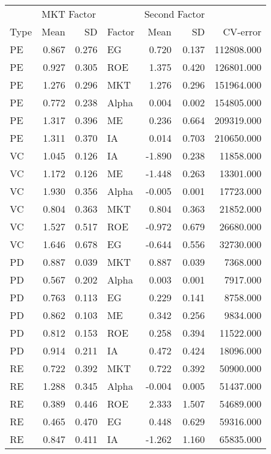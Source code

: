 \documentclass[12pt]{article}
\begin{document}
\begin{table}[ht]
	\centering
	\begin{tabular}{lrrlrrr}
		 & \multicolumn{2}{l}{MKT Factor} & & \multicolumn{2}{l}{Second Factor} & \\ 
		Type & Mean & SD & Factor & Mean & SD & CV-error \\ 
		\hline
		\hline
PE & 0.867 & 0.276 & EG & 0.720 & 0.137 & 112808.000 \\ 
PE & 0.927 & 0.305 & ROE & 1.375 & 0.420 & 126801.000 \\ 
PE & 1.276 & 0.296 & MKT & 1.276 & 0.296 & 151964.000 \\ 
PE & 0.772 & 0.238 & Alpha & 0.004 & 0.002 & 154805.000 \\ 
PE & 1.317 & 0.396 & ME & 0.236 & 0.664 & 209319.000 \\ 
PE & 1.311 & 0.370 & IA & 0.014 & 0.703 & 210650.000 \\ 
\hline
VC & 1.045 & 0.126 & IA & -1.890 & 0.238 & 11858.000 \\ 
VC & 1.172 & 0.126 & ME & -1.448 & 0.263 & 13301.000 \\ 
VC & 1.930 & 0.356 & Alpha & -0.005 & 0.001 & 17723.000 \\ 
VC & 0.804 & 0.363 & MKT & 0.804 & 0.363 & 21852.000 \\ 
VC & 1.527 & 0.517 & ROE & -0.972 & 0.679 & 26680.000 \\ 
VC & 1.646 & 0.678 & EG & -0.644 & 0.556 & 32730.000 \\ 
\hline
PD & 0.887 & 0.039 & MKT & 0.887 & 0.039 & 7368.000 \\ 
PD & 0.567 & 0.202 & Alpha & 0.003 & 0.001 & 7917.000 \\ 
PD & 0.763 & 0.113 & EG & 0.229 & 0.141 & 8758.000 \\ 
PD & 0.862 & 0.103 & ME & 0.342 & 0.256 & 9834.000 \\ 
PD & 0.812 & 0.153 & ROE & 0.258 & 0.394 & 11522.000 \\ 
PD & 0.914 & 0.211 & IA & 0.472 & 0.424 & 18096.000 \\
\hline 
RE & 0.722 & 0.392 & MKT & 0.722 & 0.392 & 50900.000 \\ 
RE & 1.288 & 0.345 & Alpha & -0.004 & 0.005 & 51437.000 \\ 
RE & 0.389 & 0.446 & ROE & 2.333 & 1.507 & 54689.000 \\ 
RE & 0.465 & 0.470 & EG & 0.448 & 0.629 & 59316.000 \\ 
RE & 0.847 & 0.411 & IA & -1.262 & 1.160 & 65835.000 \\ 

\end{tabular}
\end{table}
\end{document}
